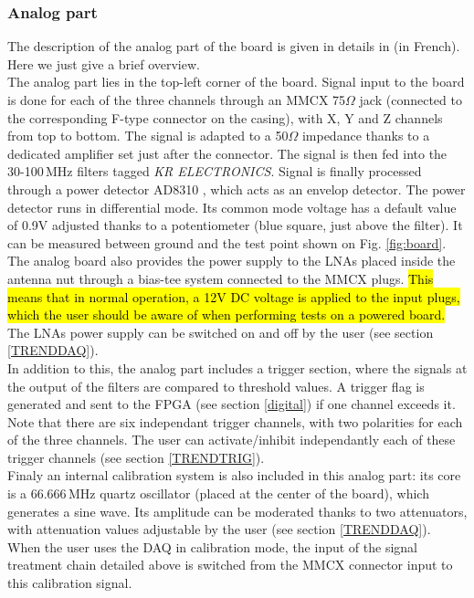 \subsubsection{Analog part}
\label{analog}
The description of the analog part of the board is given in details in \cite{GP35ana} (in French). Here we just give a brief overview. \\
%
The analog part lies in the top-left corner of the board. Signal input to the board is done  for each of the three channels through an MMCX 75$\Omega$ jack (connected to the corresponding F-type connector on the casing), with X, Y and Z channels from top to bottom. The signal is adapted to a 50$\Omega$ impedance thanks to a dedicated amplifier set just after the connector. The signal is then fed into the 30-100\,MHz filters tagged {\it KR ELECTRONICS}. Signal is finally processed through a power detector AD8310 \cite{AD8310}, which acts as an envelop detector. The power detector runs in differential mode. Its common mode voltage has a default value of 0.9V adjusted thanks to a potentiometer (blue square, just above the filter). It can be measured between ground and the test point shown on Fig. \ref{fig:board}. \\
%
The analog board also provides the power supply to the LNAs placed inside the antenna nut through a bias-tee system connected to the MMCX plugs. \hl{This means that in normal operation, a 12V DC voltage is applied to the input plugs, which the user should be aware of when performing tests on a powered board.} The LNAs power supply can be switched on and off by the user (see section \ref{TRENDDAQ}).  \\
%
In addition to this, the analog part includes a trigger section, where the signals at the output of the filters are compared to threshold values. A trigger flag is generated and sent to the FPGA (see section \ref{digital}) if one channel exceeds it. Note that there are six independant trigger channels, with two polarities for each of the three channels. The user can activate/inhibit independantly each of these trigger channels (see section \ref{TRENDTRIG}). \\
%
Finaly an internal calibration system is also included in this analog part: its core is a 66.666\,MHz quartz oscillator (placed at the center of the board), which generates a sine wave. Its amplitude can be moderated thanks to two attenuators, with attenuation values adjustable by the user (see section \ref{TRENDDAQ}). When the user uses the DAQ in calibration mode, the input of the signal treatment chain detailed above is switched from the MMCX connector input to this calibration signal.
   

